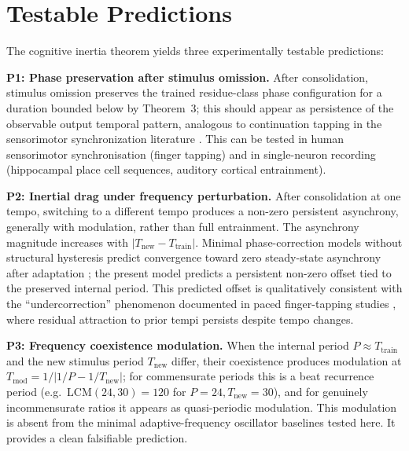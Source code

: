 \section{Testable Predictions}
\label{sec:predictions}

The cognitive inertia theorem yields three experimentally testable predictions:

\textbf{P1: Phase preservation after stimulus omission.}
After consolidation, stimulus omission preserves the trained residue-class phase configuration for a duration bounded below by Theorem~3; this should appear as persistence of the observable output temporal pattern, analogous to continuation tapping in the sensorimotor synchronization literature \cite{repp2005sensorimotor, repp2013sensorimotor}. This can be tested in human sensorimotor synchronisation (finger tapping) and in single-neuron recording (hippocampal place cell sequences, auditory cortical entrainment).

\textbf{P2: Inertial drag under frequency perturbation.}
After consolidation at one tempo, switching to a different tempo produces a non-zero persistent asynchrony, generally with modulation, rather than full entrainment. The asynchrony magnitude increases with $|T_{\mathrm{new}} - T_{\mathrm{train}}|$. Minimal phase-correction models without structural hysteresis predict convergence toward zero steady-state asynchrony after adaptation \cite{mates1994compensation}; the present model predicts a persistent non-zero offset tied to the preserved internal period. This predicted offset is qualitatively consistent with the ``undercorrection'' phenomenon documented in paced finger-tapping studies \cite{repp2005sensorimotor, silva2024, hall2023}, where residual attraction to prior tempi persists despite tempo changes.

\textbf{P3: Frequency coexistence modulation.}
When the internal period $P \approx T_{\mathrm{train}}$ and the new stimulus period $T_{\mathrm{new}}$ differ, their coexistence produces modulation at $T_{\mathrm{mod}} = 1/|1/P - 1/T_{\mathrm{new}}|$; for commensurate periods this is a beat recurrence period (e.g.\ $\mathrm{LCM}(24,30)=120$ for $P=24, T_{\mathrm{new}}=30$), and for genuinely incommensurate ratios it appears as quasi-periodic modulation. This modulation is absent from the minimal adaptive-frequency oscillator baselines tested here. It provides a clean falsifiable prediction.


